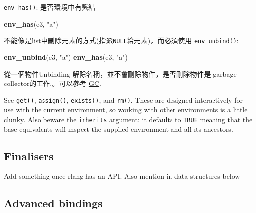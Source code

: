 \documentclass[]{book}
\newenvironment{Shaded}{\begin{snugshade}}{\end{snugshade}}
\newcommand{\KeywordTok}[1]{\textcolor[rgb]{0.13,0.29,0.53}{\textbf{#1}}}
\newcommand{\NormalTok}[1]{#1}
\newcommand{\OperatorTok}[1]{\textcolor[rgb]{0.81,0.36,0.00}{\textbf{#1}}}
\newcommand{\OtherTok}[1]{\textcolor[rgb]{0.56,0.35,0.01}{#1}}
\newcommand{\StringTok}[1]{\textcolor[rgb]{0.31,0.60,0.02}{#1}}
\theoremstyle{definition}
\theoremstyle{definition}
\theoremstyle{definition}
\theoremstyle{remark}
\begin{document}
\texttt{env\_has()}: 是否環境中有繫結

\begin{Shaded}
\begin{Highlighting}[]
\KeywordTok{env_has}\NormalTok{(e3, }\StringTok{"a"}\NormalTok{)}
\end{Highlighting}
\end{Shaded}

不能像是list中刪除元素的方式(指派\texttt{NULL}給元素)，而必須使用
\texttt{env\_unbind()}:

\begin{Shaded}
\end{Shaded}

\begin{Shaded}
\begin{Highlighting}[]
\KeywordTok{env_unbind}\NormalTok{(e3, }\StringTok{"a"}\NormalTok{)}
\KeywordTok{env_has}\NormalTok{(e3, }\StringTok{"a"}\NormalTok{)}
\end{Highlighting}
\end{Shaded}

從一個物件Unbinding 解除名稱，並不會刪除物件，是否刪除物件是 garbage
collector的工作.。可以參考 \protect\hyperlink{gc}{GC}.

See \texttt{get()}, \texttt{assign()}, \texttt{exists()}, and
\texttt{rm()}. These are designed interactively for use with the current
environment, so working with other environments is a little clunky. Also
beware the \texttt{inherits} argument: it defaults to \texttt{TRUE}
meaning that the base equivalents will inspect the supplied environment
and all its ancestors.

\hypertarget{finalisers}{%
\subsection{Finalisers}\label{finalisers}}

{Add something once rlang has an API. Also mention in data structures
below}

\hypertarget{advanced-bindings}{%
\subsection{Advanced bindings}\label{advanced-bindings}}
\end{document}
